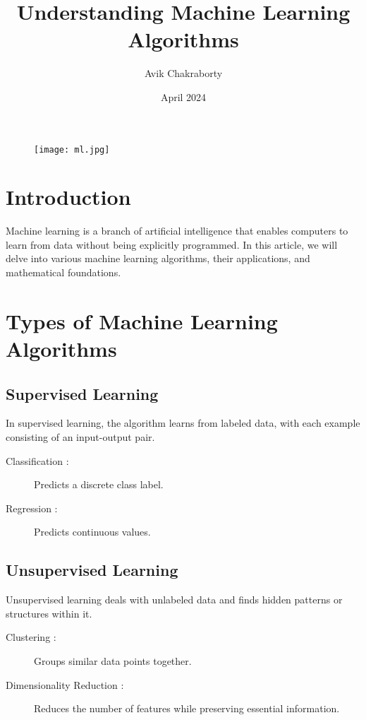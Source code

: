 \documentclass{article}
\begin{document}
	
	
	\begin{figure}[H]
		\texttt{[image: ml.jpg]}
	\end{figure}
	\tableofcontents
	
	\title{Understanding Machine Learning Algorithms}
	\author{Avik Chakraborty}
	\date{April 2024}
	\maketitle
	
	\section{Introduction}
	Machine learning is a branch of artificial intelligence that enables computers to learn from data without being explicitly programmed. In this article, we will delve into various machine learning algorithms, their applications, and mathematical foundations.
	
	\section{Types of Machine Learning Algorithms}
	\subsection{Supervised Learning}
	In supervised learning, the algorithm learns from labeled data, with each example consisting of an input-output pair.
	\begin{description}
		\item[Classification :] Predicts a discrete class label.
		\item[Regression :] Predicts continuous values.
	\end{description}
	
	\subsection{Unsupervised Learning}
	Unsupervised learning deals with unlabeled data and finds hidden patterns or structures within it.
	\begin{description}
		\item[Clustering :] Groups similar data points together.
		\item[Dimensionality Reduction :] Reduces the number of features while preserving essential information.
	\end{description}
	
\end{document}
